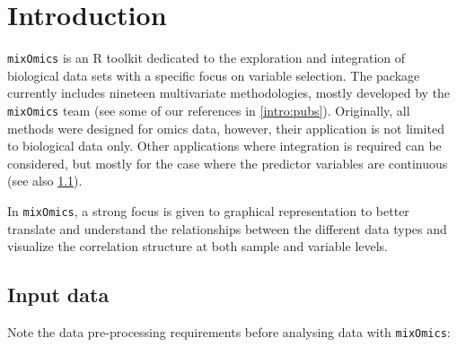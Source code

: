 \documentclass[]{book}
\begin{document}
\hypertarget{intro}{%
\chapter{Introduction}\label{intro}}

\texttt{mixOmics} is an R toolkit dedicated to the exploration and integration of biological data sets with a specific focus on variable selection. The package currently includes nineteen multivariate methodologies, mostly developed by the \texttt{mixOmics} team (see some of our references in \ref{intro:pubs}). Originally, all methods were designed for omics data, however, their application is not limited to biological data only. Other applications where integration is required can be considered, but mostly for the case where the predictor variables are continuous (see also \ref{intro:datatypes}).

In \texttt{mixOmics}, a strong focus is given to graphical representation to better translate and understand the relationships between the different data types and visualize the correlation structure at both sample and variable levels.

\hypertarget{intro:datatypes}{%
\section{Input data}\label{intro:datatypes}}

Note the data pre-processing requirements before analysing data with \texttt{mixOmics}:
\end{document}
